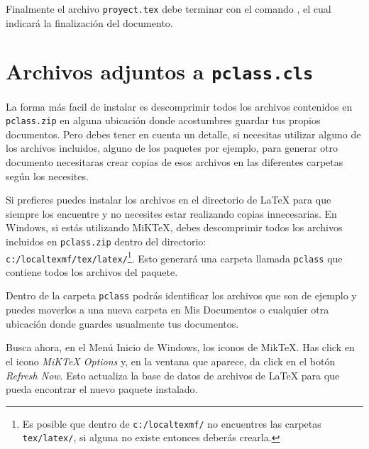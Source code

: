 Finalmente el archivo \texttt{proyect.tex} debe terminar con el comando \verb||, el cual
indicar\'a la finalizaci\'on del documento.




\section{Archivos adjuntos a \texttt{pclass.cls}}\label{paquete}

La forma m\'as facil de instalar es descomprimir todos los archivos contenidos
en \texttt{pclass.zip} en alguna ubicaci\'on donde acostumbres guardar tus propios documentos. 
Pero debes tener en cuenta un detalle, si necesitas utilizar alguno de los archivos incluidos, alguno
de los paquetes por ejemplo, para generar otro documento necesitaras crear copias de esos archivos en las 
diferentes carpetas seg\'un los necesites.

Si prefieres puedes instalar los archivos
en el directorio de \LaTeX{} para que siempre los encuentre y no necesites estar
realizando copias innecesarias. En Windows, si est\'as utilizando MiK\TeX{}, debes
descomprimir todos los archivos incluidos en \texttt{pclass.zip} dentro del
directorio:\\ 
\texttt{c:/localtexmf/tex/latex/}\footnote{Es posible que dentro de \texttt{c:/localtexmf/} 
no encuentres las carpetas \texttt{tex/latex/}, si alguna no existe entonces deber\'as crearla.}. Esto generar\'a
una carpeta llamada \texttt{pclass} que contiene todos los archivos del paquete.

Dentro de la carpeta \texttt{pclass} podr\'as identificar los archivos que son de ejemplo
y puedes moverlos a una nueva carpeta en Mis Documentos o cualquier otra ubicaci\'on
donde guardes usualmente tus documentos.

Busca ahora, en el Men\'u Inicio de Windows, los iconos de Mik\TeX{}. Has click
en el icono \emph{MiKTeX Options} y, en la ventana que aparece, da click en el
bot\'on \emph{Refresh Now}. Esto actualiza la base de datos de archivos de
\LaTeX{} para que pueda encontrar el nuevo paquete instalado.
